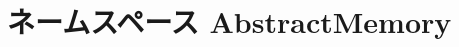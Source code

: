\hypertarget{namespaceAbstractMemory}{
\section{ネームスペース AbstractMemory}
\label{namespaceAbstractMemory}
}
